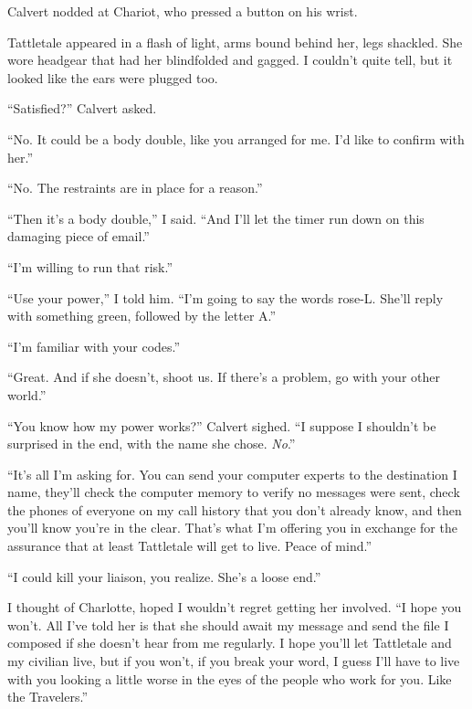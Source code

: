 Calvert nodded at Chariot, who pressed a button on his wrist.



Tattletale appeared in a flash of light, arms bound behind her, legs shackled.  She wore headgear that had her blindfolded and gagged.  I couldn't quite tell, but it looked like the ears were plugged too.



``Satisfied?'' Calvert asked.



``No.  It could be a body double, like you arranged for me.  I'd like to confirm with her.''



``No.  The restraints are in place for a reason.''



``Then it's a body double,'' I said.  ``And I'll let the timer run down on this damaging piece of email.''



``I'm willing to run that risk.''



``Use your power,'' I told him.  ``I'm going to say the words rose-L.  She'll reply with something green, followed by the letter A.''



``I'm familiar with your codes.''



``Great.  And if she doesn't, shoot us.  If there's a problem, go with your other world.''



``You know how my power works?'' Calvert sighed.  ``I suppose I shouldn't be surprised in the end, with the name she chose.  \emph{No}.''



``It's all I'm asking for.  You can send your computer experts to the destination I name, they'll check the computer memory to verify no messages were sent, check the phones of everyone on my call history that you don't already know, and then you'll know you're in the clear.  That's what I'm offering you in exchange for the assurance that at least Tattletale will get to live.  Peace of mind.''



``I could kill your liaison, you realize.  She's a loose end.''



I thought of Charlotte, hoped I wouldn't regret getting her involved.  ``I hope you won't.  All I've told her is that she should await my message and send the file I composed if she doesn't hear from me regularly.  I hope you'll let Tattletale and my civilian live, but if you won't, if you break your word, I guess I'll have to live with you looking a little worse in the eyes of the people who work for you.  Like the Travelers.''



